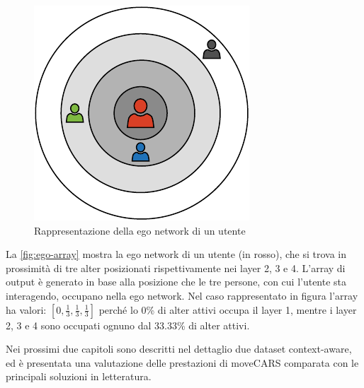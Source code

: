 \documentclass[12pt,italian]{report}
\begin{document}
\begin{figure}
  \centering
  \includegraphics[scale=1]{immagini/ego-net.pdf}
  \caption{Rappresentazione della ego network di un utente}
  \label{fig:ego-array}	
\end{figure}

La \autoref{fig:ego-array} mostra la ego network di un utente (in rosso), che si trova in prossimità di tre alter posizionati rispettivamente nei layer 2, 3 e 4. L'array di output è generato in base alla posizione che le tre persone, con cui l'utente sta interagendo, occupano nella ego network. Nel caso rappresentato in figura l'array ha valori:
$[0, \frac{1}{3}, \frac{1}{3}, \frac{1}{3}]$ perché lo 0\% di alter attivi occupa il layer 1, mentre i layer 2, 3 e 4 sono occupati ognuno dal 33.33\% di alter attivi. 

Nei prossimi due capitoli sono descritti nel dettaglio due dataset context-aware, ed è presentata una valutazione delle prestazioni di moveCARS comparata con le principali soluzioni in letteratura.

% 
% 
\end{document}
